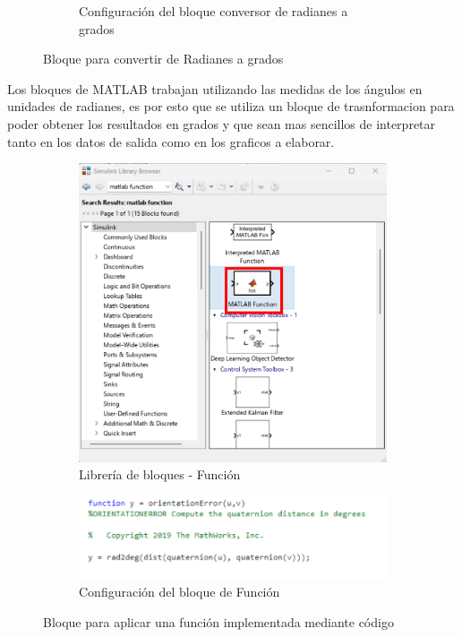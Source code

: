 \begin{figure}[htbp]
\begin{subfigure}[b]{0.45\textwidth}
        \caption{Configuración del bloque conversor de radianes a grados}
        \label{fig:conf_bloques_R2D}
    \end{subfigure}
    \caption{Bloque para convertir de Radianes a grados}
    \label{fig:bloques_R2D}
\end{figure}

Los bloques de MATLAB trabajan utilizando las medidas de los ángulos en unidades de radianes, es por esto que se utiliza un bloque de trasnformacion para poder obtener los resultados en grados y que sean mas sencillos de interpretar tanto en los datos de salida como en los graficos a elaborar.

\newpage

\begin{figure}[htbp]
    \centering
    \begin{subfigure}[b]{0.35\textwidth}
        \centering
        \includegraphics[width=\textwidth]{fig/Capitulo5/Caso_de_estudio_IMU/Generador_de_salidas/libreria_bloque_de_funcion.pdf}
        \caption{Librería de bloques - Función}
        \label{fig:lib_bloques_func}
    \end{subfigure}
    \hfill
    \begin{subfigure}[b]{0.45\textwidth}
        \centering
        \includegraphics[width=\textwidth]{fig/Capitulo5/Caso_de_estudio_IMU/Generador_de_salidas/configuracion_codigo.pdf}
        \caption{Configuración del bloque de Función}
        \label{fig:config_bloques_func}
    \end{subfigure}
    \caption{Bloque para aplicar una función implementada mediante código}
    \label{fig:bloques_func}
\end{figure}

